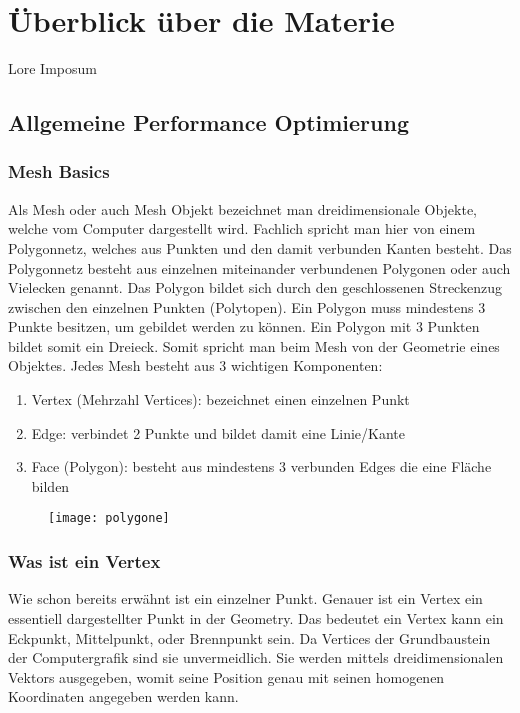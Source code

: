 \chapter{Überblick über die Materie}

Lore Imposum

\section{Allgemeine Performance Optimierung}

\subsection{Mesh Basics}

Als Mesh oder auch Mesh Objekt bezeichnet man dreidimensionale Objekte, welche vom Computer dargestellt wird. Fachlich spricht man hier von einem Polygonnetz, welches aus Punkten und den damit verbunden Kanten besteht. Das Polygonnetz besteht aus einzelnen miteinander verbundenen Polygonen oder auch Vielecken genannt. Das Polygon bildet sich durch den geschlossenen Streckenzug zwischen den einzelnen Punkten (Polytopen). Ein Polygon muss mindestens 3 Punkte besitzen, um gebildet werden zu können. Ein Polygon mit 3 Punkten bildet somit ein Dreieck. Somit spricht man beim Mesh von der Geometrie eines Objektes. Jedes Mesh besteht aus 3 wichtigen Komponenten:
\begin{enumerate}[]
	\item Vertex (Mehrzahl Vertices): bezeichnet einen einzelnen Punkt
	\item Edge: verbindet 2 Punkte und bildet damit eine Linie/Kante
	\item Face (Polygon): besteht aus mindestens 3 verbunden Edges die eine Fläche bilden
\end{enumerate}

\begin{figure}[h]
	\centering
	\texttt{[image: polygone]}
	\caption{\cite{_polygons}}
\end{figure}

\subsection{Was ist ein Vertex}

Wie schon bereits erwähnt ist ein einzelner Punkt. Genauer ist ein Vertex ein essentiell dargestellter Punkt in der Geometry. Das bedeutet ein Vertex kann ein Eckpunkt, Mittelpunkt, oder Brennpunkt sein. Da Vertices der Grundbaustein der Computergrafik sind sie unvermeidlich. Sie werden mittels dreidimensionalen Vektors ausgegeben, womit seine Position genau mit seinen homogenen Koordinaten angegeben werden kann.

